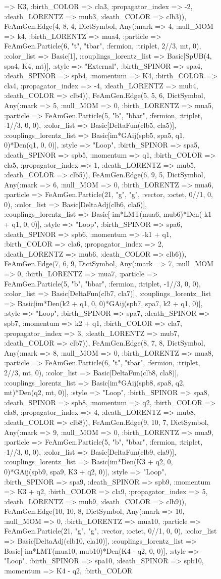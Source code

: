 \documentclass{revtex4}
\begin{document}
\begin{figure}[!htb]
\begin{center}
{=> K3, :birth_COLOR => cla3, :propagator_index => -2, :death_LORENTZ => mub3, :death_COLOR => clb3)), FeAmGen.Edge(4, 8, 4, Dict{Symbol, Any}(:mark => 4, :null_MOM => k4, :birth_LORENTZ => mua4, :particle => FeAmGen.Particle(6, "t", "tbar", :fermion, :triplet, 2//3, mt, 0), :color_list => Basic[1], :couplings_lorentz_list => Basic[SpUB(4, spa4, K4, mt)], :style => "External", :birth_SPINOR => spa4, :death_SPINOR => spb4, :momentum => K4, :birth_COLOR => cla4, :propagator_index => -4, :death_LORENTZ => mub4, :death_COLOR => clb4)), FeAmGen.Edge(5, 5, 6, Dict{Symbol, Any}(:mark => 5, :null_MOM => 0, :birth_LORENTZ => mua5, :particle => FeAmGen.Particle(5, "b", "bbar", :fermion, :triplet, -1//3, 0, 0), :color_list => Basic[DeltaFun(clb5, cla5)], :couplings_lorentz_list => Basic[im*GAij(spb5, spa5, q1, 0)*Den(q1, 0, 0)], :style => "Loop", :birth_SPINOR => spa5, :death_SPINOR => spb5, :momentum => q1, :birth_COLOR => cla5, :propagator_index => 1, :death_LORENTZ => mub5, :death_COLOR => clb5)), FeAmGen.Edge(6, 9, 5, Dict{Symbol, Any}(:mark => 6, :null_MOM => 0, :birth_LORENTZ => mua6, :particle => FeAmGen.Particle(21, "g", "g", :vector, :octet, 0//1, 0, 0), :color_list => Basic[DeltaAdj(clb6, cla6)], :couplings_lorentz_list => Basic[-im*LMT(mua6, mub6)*Den(-k1 + q1, 0, 0)], :style => "Loop", :birth_SPINOR => spa6, :death_SPINOR => spb6, :momentum => -k1 + q1, :birth_COLOR => cla6, :propagator_index => 2, :death_LORENTZ => mub6, :death_COLOR => clb6)), FeAmGen.Edge(7, 6, 9, Dict{Symbol, Any}(:mark => 7, :null_MOM => 0, :birth_LORENTZ => mua7, :particle => FeAmGen.Particle(5, "b", "bbar", :fermion, :triplet, -1//3, 0, 0), :color_list => Basic[DeltaFun(clb7, cla7)], :couplings_lorentz_list => Basic[im*Den(k2 + q1, 0, 0)*GAij(spb7, spa7, k2 + q1, 0)], :style => "Loop", :birth_SPINOR => spa7, :death_SPINOR => spb7, :momentum => k2 + q1, :birth_COLOR => cla7, :propagator_index => 3, :death_LORENTZ => mub7, :death_COLOR => clb7)), FeAmGen.Edge(8, 7, 8, Dict{Symbol, Any}(:mark => 8, :null_MOM => 0, :birth_LORENTZ => mua8, :particle => FeAmGen.Particle(6, "t", "tbar", :fermion, :triplet, 2//3, mt, 0), :color_list => Basic[DeltaFun(clb8, cla8)], :couplings_lorentz_list => Basic[im*GAij(spb8, spa8, q2, mt)*Den(q2, mt, 0)], :style => "Loop", :birth_SPINOR => spa8, :death_SPINOR => spb8, :momentum => q2, :birth_COLOR => cla8, :propagator_index => 4, :death_LORENTZ => mub8, :death_COLOR => clb8)), FeAmGen.Edge(9, 10, 7, Dict{Symbol, Any}(:mark => 9, :null_MOM => 0, :birth_LORENTZ => mua9, :particle => FeAmGen.Particle(5, "b", "bbar", :fermion, :triplet, -1//3, 0, 0), :color_list => Basic[DeltaFun(clb9, cla9)], :couplings_lorentz_list => Basic[im*Den(K3 + q2, 0, 0)*GAij(spb9, spa9, K3 + q2, 0)], :style => "Loop", :birth_SPINOR => spa9, :death_SPINOR => spb9, :momentum => K3 + q2, :birth_COLOR => cla9, :propagator_index => 5, :death_LORENTZ => mub9, :death_COLOR => clb9)), FeAmGen.Edge(10, 10, 8, Dict{Symbol, Any}(:mark => 10, :null_MOM => 0, :birth_LORENTZ => mua10, :particle => FeAmGen.Particle(21, "g", "g", :vector, :octet, 0//1, 0, 0), :color_list => Basic[DeltaAdj(clb10, cla10)], :couplings_lorentz_list => Basic[-im*LMT(mua10, mub10)*Den(K4 - q2, 0, 0)], :style => "Loop", :birth_SPINOR => spa10, :death_SPINOR => spb10, :momentum => K4 - q2, :birth_COLOR }
\end{center}
\end{figure}
\end{document}
